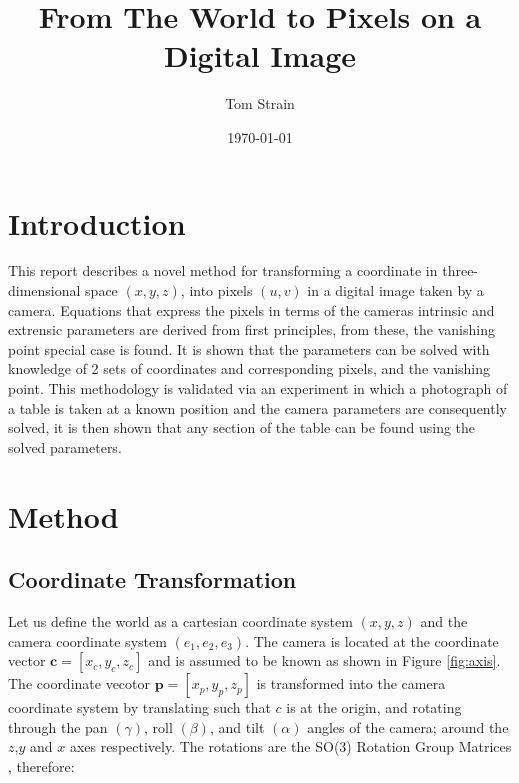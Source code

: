 \documentclass[12pt]{article}
\title{From The World to Pixels on a Digital Image}
\date{\today}
\author{Tom Strain}
\newcommand{\mtx}[1]{\ensuremath{\mathbf{#1}}}
\begin{document}
\maketitle
\section{Introduction}
This report describes a novel method for transforming a coordinate in three-dimensional space $(x,y,z)$, into pixels $ (u,v)$ in a digital image taken by a camera. Equations that express the pixels in terms of the cameras intrinsic and extrensic parameters are derived from first principles, from these, the vanishing point special case is found. It is shown that the parameters can be solved with knowledge of 2 sets of coordinates and corresponding pixels, and the vanishing point. This methodology is validated via an experiment in which a photograph of a table is taken at a known position and the camera parameters are consequently solved, it is then shown that any section of the table can be found using the solved parameters. 

\section{Method}
\subsection{Coordinate Transformation} 
Let us define the world as a cartesian coordinate system $(x,y,z)$ and the camera coordinate system $ (e_1,e_2,e_3)$. The camera is located at the coordinate vector  $\mtx{c} = [x_c,y_c,z_c]$ and is assumed to be known as shown in Figure \ref{fig:axis}. The coordinate vecotor $\mtx{p} = [x_p,y_p,z_p]$ is transformed into the camera coordinate system by translating such that $c$ is at the origin, and rotating through the pan $(\gamma)$, roll $(\beta)$, and tilt $(\alpha)$ angles of the camera; around the $z$,$y$ and $x$ axes respectively. The rotations are the SO(3) Rotation Group Matrices \cite{rotations}, therefore:
\end{document}
